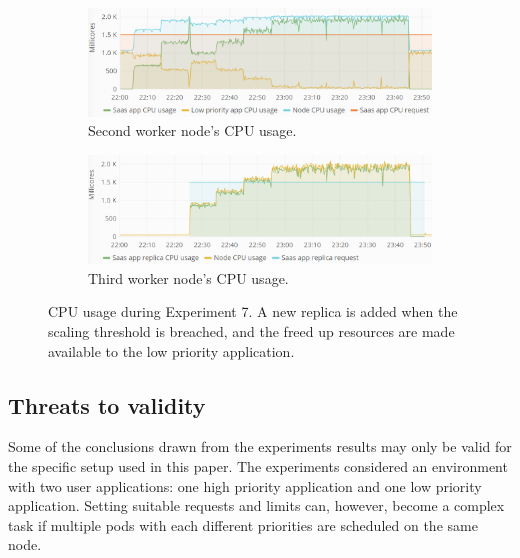 %
%
\begin{figure}
\centering
\begin{subfigure}[b]{\columnwidth}
\centering
\includegraphics[width=0.75\columnwidth]{Images/Experiments/CPU/Grafana/cpu-saas-lpp-hpa-li-1.PNG}
\caption{Second worker node's CPU usage.}
\label{fig:cpu-saas-lpp-hpa-li-1}
\end{subfigure}
\hfill
\centering
\begin{subfigure}[b]{\columnwidth}
\centering
\includegraphics[width=0.75\columnwidth]{Images/Experiments/CPU/Grafana/cpu-saas-lpp-hpa-li-2.PNG}
\caption{Third worker node's CPU usage.}
\label{fig:cpu-saas-lpp-hpa-li-2}
\end{subfigure}
\hfill
\vspace*{-7mm}
\caption{CPU usage during Experiment 7. A new replica is added when the scaling threshold is breached, and the freed up resources are made available to the low priority application.}
\vspace{-5mm}
\label{fig:cpu-saas-lpp-hpa-li}
\end{figure}

\subsection{Threats to validity}
Some of the conclusions drawn from the experiments results may only be valid for the specific setup used in this paper. The experiments considered an environment with two user applications: one high priority application and one low priority application. Setting suitable requests and limits can, however, become a complex task if multiple pods with each different priorities are scheduled on the same node.

